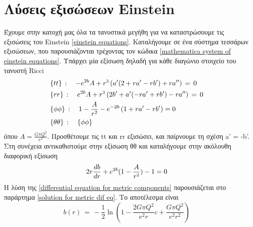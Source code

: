 
\section{Λύσεις εξισώσεων Einstein}
Έχουμε στην κατοχή μας όλα τα τανυστικά μεγήθη για να καταστρώσουμε τις εξισώσεις του Einstein \eqref{einstein equations}. Καταλήγουμε σε ένα σύστημα τεσσάρων εξισώσεων, που παρουσιάζονται τρέχοντας τον κώδικα \ref{mathematica system of einstein equations}. Υπάρχει μία εξίσωση δηλαδή για κάθε διαγώνιο στοιχείο του τανυστή Ricci   
\begin{equation}
    \begin{split}
        &\{tt\}\,:\quad -e^{2b}A + r\superscr{3}\left( a'(2+ra'-rb')+ra'' \right)\,=\,0\\
        &\{rr\}\,:\quad e^{2b}A + r\superscr{3}\left( 2b'+a'(-ra'+rb')-ra'' \right) \,=\,0 \\
        &\{\phi\phi\}\,:\quad  1 - \frac{A}{r^2} - e^{-2b}\left( 1 + ra' -rb' \right) = 0\\
        &\{\theta\theta\}\,:\quad \{ \phi\phi \}
    \end{split}
\end{equation}
όπου $A=\frac{G\pi Q^2}{e^2}$. Προσθέτουμε τις tt και rr εξισώσει, και παίρνουμε τη σχέση a' = -b'. Στη συνέχεια αντικαθιστούμε στην εξίσωση θθ και καταλήγουμε στην ακόλουθη διαφορική εξίσωση 
\begin{equation}\label{differential equation for metric components}
    2r\frac{db}{dr}+e^{2b}(1-\frac{A}{r\superscr{2}})-1=0
\end{equation}
Η λύση της \eqref{differential equation for metric components} παρουσιάζεται στο παράρτημα \ref{solution for metric dif eq}. Το αποτέλεσμα είναι 
\begin{equation}
    b(r) \,=\, -\frac{1}{2}\ln{\left(1-\frac{2G\pi Q^2}{e^2r}c+\frac{G\pi Q^2}{e^2r^2}\right)}
\end{equation}

